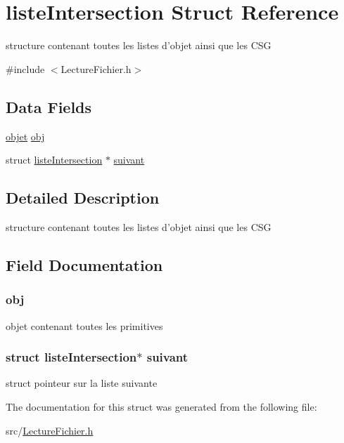 \hypertarget{structliste_intersection}{
\section{listeIntersection Struct Reference}
\label{structliste_intersection}
}


structure contenant toutes les listes d'objet ainsi que les CSG  




{\ttfamily \#include $<$LectureFichier.h$>$}

\subsection*{Data Fields}
\begin{DoxyCompactItemize}
\item 
\hyperlink{structobjet}{objet} \hyperlink{structliste_intersection_a09dc5c908d8f9c6875464379f83976c8}{obj}
\item 
struct \hyperlink{structliste_intersection}{listeIntersection} $\ast$ \hyperlink{structliste_intersection_ab14db457b43b6eabbb4d7cb0c7023379}{suivant}
\end{DoxyCompactItemize}


\subsection{Detailed Description}
structure contenant toutes les listes d'objet ainsi que les CSG 

\subsection{Field Documentation}
\hypertarget{structliste_intersection_a09dc5c908d8f9c6875464379f83976c8}{
\subsubsection[{obj}]{ {\bf obj}}}
\label{structliste_intersection_a09dc5c908d8f9c6875464379f83976c8}
objet contenant toutes les primitives \hypertarget{structliste_intersection_ab14db457b43b6eabbb4d7cb0c7023379}{
\subsubsection[{suivant}]{\setlength{\rightskip}{0pt plus 5cm}struct {\bf listeIntersection}$\ast$ {\bf suivant}}}
\label{structliste_intersection_ab14db457b43b6eabbb4d7cb0c7023379}
struct pointeur sur la liste suivante 

The documentation for this struct was generated from the following file:\begin{DoxyCompactItemize}
\item 
src/\hyperlink{_lecture_fichier_8h}{LectureFichier.h}\end{DoxyCompactItemize}
